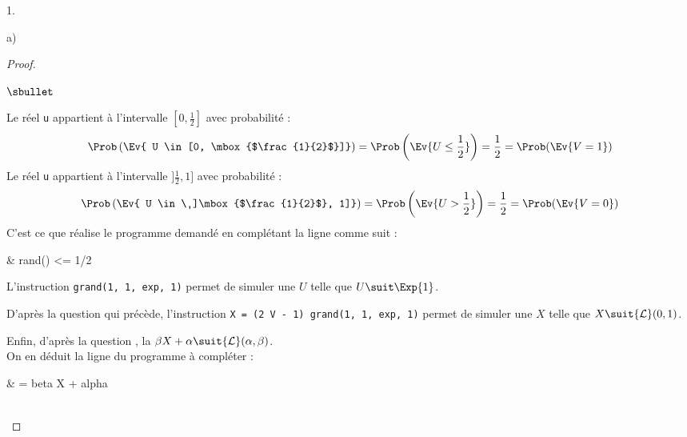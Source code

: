 \documentclass[11pt]{article}%
\begin{document}
\begin{noliste}{1.}
\begin{noliste}{a)}
\begin{proof}
\begin{noliste}{$\sbullet$}
\begin{center}
        \end{center}
        Le réel {\tt u} appartient à l'intervalle $[0, \frac{1}{2}]$
        avec probabilité :
        \[
        \Prob\left(\Ev{ U \in [0, \mbox{$\frac{1}{2}$}]} \right) =
        \Prob\left(\Ev{ U \leq \frac{1}{2}} \right) = \dfrac{1}{2} =
        \Prob(\Ev{ V = 1})
        \]
        Le réel {\tt u} appartient à l'intervalle $]\frac{1}{2}, 1]$
        avec probabilité :
        \[
        \Prob\left(\Ev{ U \in \ ]\mbox{$\frac{1}{2}$}, 1]} \right) =
        \Prob\left(\Ev{ U > \frac{1}{2}} \right) = \dfrac{1}{2} =
        \Prob(\Ev{ V = 0})
        \]
        C'est ce que réalise le programme demandé en complétant la
        ligne  comme suit :
        \begin{scilabC}{1}
          & \qquad {} rand() <= 1/2 \nl %
        \end{scilabC}
        
        
        
        
        
      \item L'instruction {\tt grand(1, 1, \ttq{}exp\ttq{}, 1)} permet
        de simuler une \var $U$ telle que $U \suit \Exp{1}$.

      \item D'après la question qui précède, l'instruction {\tt X = (2
          \Sfois{} V - 1) \Sfois{} grand(1, 1, \ttq{}exp\ttq{}, 1)}
        permet de simuler une \var $X$ telle que $X \suit {\cal L}(0,
        1)$.

      \item Enfin, d'après la question , la \var $\beta X +
        \alpha \suit {\cal L}(\alpha, \beta)$.\\
        On en déduit la ligne  du programme à compléter :
        \begin{scilabC}{7}
          & \qquad {} = beta \Sfois{} X + alpha 
        \end{scilabC}
      \end{noliste}
      ~\\[-1.4cm]
    \end{proof}
  \end{noliste}
\end{noliste}
\end{document}
